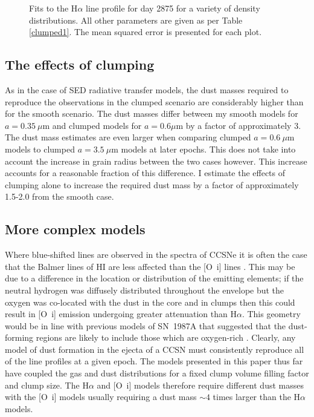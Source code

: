 \begin{figure}
\caption{Fits to the H$\alpha$ line profile for day 2875 for a variety of density distributions.  All other parameters are given as per Table \ref{clumped1}. The mean squared error is presented for each plot.}
\label{fig:MSE4}
\end{figure}

\subsection{The effects of clumping}

As in the case of SED radiative transfer models, the dust masses required 
to reproduce the observations in the clumped scenario are considerably 
higher than for the smooth scenario.  The dust masses differ between my 
smooth models for $a=0.35~\mu$m and clumped models for $a=0.6\mu$m by a 
factor of approximately 3.  The dust mass estimates are even larger when
comparing clumped $a=0.6~\mu$m models to clumped $a=3.5~\mu$m models at 
later epochs. This does not take into account the increase in grain radius 
between the two cases however.  This increase accounts for a reasonable 
fraction of this difference. I estimate the effects of clumping alone to 
increase the required dust mass by a factor of approximately 1.5-2.0 from 
the smooth case.


\subsection{More complex models}
\label{complex}

Where blue-shifted lines are observed in the spectra of CCSNe it is often the case that the Balmer lines of HI are less affected than the [O~{\sc i}] lines \citep{Milisavljevic2012}.  This may be due to a difference in the location or distribution of the emitting elements; if the neutral hydrogen was diffusely distributed throughout the envelope but the oxygen was co-located with the dust in the core and in clumps then this could result in [O~{\sc i}] emission undergoing greater attenuation than H$\alpha$.  This geometry would be in line with previous models of SN~1987A that suggested that the dust-forming regions are likely to include those which are oxygen-rich \citep{Kozma1998a}.  Clearly, any model of dust formation in the ejecta of a CCSN must consistently reproduce all of the line profiles at a given epoch.  The models presented in this paper thus far have coupled the gas and dust distributions for a fixed clump volume filling factor and clump size.  The H$\alpha$ and [O~{\sc i}] models therefore require different dust masses with the [O~{\sc i}] models usually requiring a dust mass $\sim4$ times larger than the H$\alpha$ models. 

